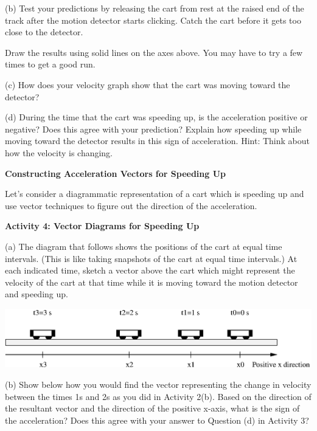 (b) Test your predictions by releasing the cart from rest at the raised end of the track after the motion detector starts clicking. Catch the cart before it gets too close to the detector.

Draw the results using solid lines on the axes above. You may have to try a
few times to get a good run.

(c) How does your velocity graph show that the cart was moving toward the detector? 
\vspace{20mm}

(d) During the time that the cart was speeding up, is the acceleration positive
or negative? Does this agree with your prediction? Explain how speeding up while
moving toward the detector results in this sign of acceleration. Hint: Think
about how the velocity is changing.
\vspace{20mm}

\pagebreak[2]
\textbf{Constructing Acceleration Vectors for Speeding Up} 

Let's consider a diagrammatic representation of a cart which is speeding up
and use vector techniques to figure out the direction of the acceleration.


\textbf{Activity 4: Vector Diagrams for Speeding Up} 

(a) The diagram that follows shows the positions of the cart at equal time intervals.
(This is like taking snapshots of the cart at equal time intervals.) At each
indicated time, sketch a vector above the cart which might represent the velocity
of the cart at that time while it is moving toward the motion detector and speeding
up.

\vspace{0.3cm}
{\par\centering \includegraphics{slowing/slowing_fig3.eps} \par}
\vspace{0.3cm}

(b) Show below how you would find the vector representing the change in velocity
between the times 1s and 2s as you did in Activity 2(b). Based on the 
direction of the resultant vector and the direction of the positive x-axis, 
what is the sign of the acceleration? 
Does this agree with your answer to Question (d) in Activity 3?
\vspace{20mm}

